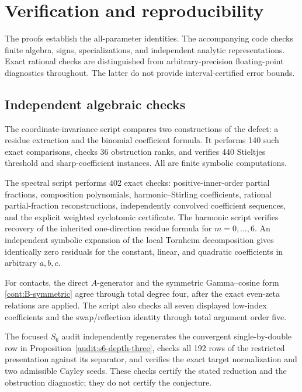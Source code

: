 \section{Verification and reproducibility}
\label{verify:sec}

The proofs establish the all-parameter identities. The accompanying
code checks finite algebra, signs, specializations, and independent
analytic representations. Exact rational checks are distinguished
from arbitrary-precision floating-point diagnostics throughout.
The latter do not provide interval-certified error bounds.

\subsection{Independent algebraic checks}

The coordinate-invariance script compares two constructions of the
defect: a residue extraction and the binomial coefficient formula.
It performs 140 such exact comparisons, checks 36 obstruction ranks,
and verifies 440 Stieltjes threshold and sharp-coefficient instances.
All are finite symbolic computations.

The spectral script performs 402 exact checks: positive-inner-order
partial fractions, composition polynomials, harmonic--Stirling
coefficients, rational partial-fraction reconstructions, independently
convolved coefficient sequences, and the explicit weighted
cyclotomic certificate. The harmonic script verifies recovery of
the inherited one-direction residue formula for $m=0,\ldots,6$.
An independent symbolic expansion of the local Tornheim
decomposition gives identically zero residuals for the constant,
linear, and quadratic coefficients in arbitrary $a,b,c$.

For contacts, the direct $A$-generator and the symmetric
Gamma--cosine form \eqref{cont:B-symmetric} agree through total degree
four, after the exact even-zeta relations are applied. The script
also checks all seven displayed low-index coefficients and the
swap/reflection identity through total argument order five.

The focused $S_6$ audit independently regenerates the convergent
single-by-double row in Proposition~\ref{audit:s6-depth-three}, checks
all 192 rows of the restricted presentation against its separator,
and verifies the exact target normalization and two admissible
Cayley seeds. These checks certify the stated reduction and the
obstruction diagnostic; they do not certify the conjecture.

